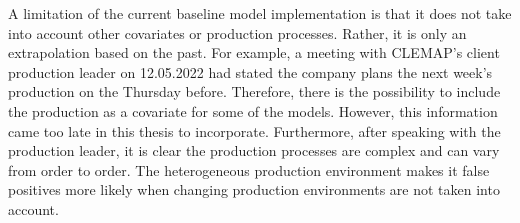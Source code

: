 A limitation of the current baseline model implementation is that it does not take into account other covariates or production processes. Rather, it is only an extrapolation based on the past. For example, a meeting with CLEMAP's client production leader on 12.05.2022 had stated the company plans the next week's production on the Thursday before. Therefore, there is the possibility to include the production as a covariate for some of the models. However, this information came too late in this thesis to incorporate. Furthermore, after speaking with the production leader, it is clear the production processes are complex and can vary from order to order. The heterogeneous production environment makes it false positives more likely when changing production environments are not taken into account.